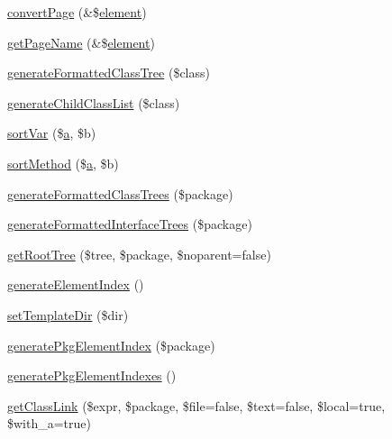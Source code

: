 \begin{DoxyCompactItemize}
\item 
\hyperlink{class_x_m_l_doc_bookpeardoc2_converter_a48d30cbead70c887449fda723aa0bb6e}{convert\-Page} (\&\$\hyperlink{bug-904820_8php_aa94081298ab2dfd0f261cce6c203d9aa}{element})
\item 
\hyperlink{class_x_m_l_doc_bookpeardoc2_converter_ad39e717881e42150610bbed94471f8bf}{get\-Page\-Name} (\&\$\hyperlink{bug-904820_8php_aa94081298ab2dfd0f261cce6c203d9aa}{element})
\item 
\hyperlink{class_x_m_l_doc_bookpeardoc2_converter_a694db0f7353906320d85ee37bd7e2fc5}{generate\-Formatted\-Class\-Tree} (\$class)
\item 
\hyperlink{class_x_m_l_doc_bookpeardoc2_converter_ae3d547d6452f75ae918c03ff383ee29f}{generate\-Child\-Class\-List} (\$class)
\item 
\hyperlink{class_x_m_l_doc_bookpeardoc2_converter_a289e8b5fc5ba77255d344e7d24ac64a5}{sort\-Var} (\$\hyperlink{classa}{a}, \$b)
\item 
\hyperlink{class_x_m_l_doc_bookpeardoc2_converter_ac169dd8b41da10e16c21f4e6685ee3af}{sort\-Method} (\$\hyperlink{classa}{a}, \$b)
\item 
\hyperlink{class_x_m_l_doc_bookpeardoc2_converter_ac4ce6d55dd5c5683966b882dcc6809e0}{generate\-Formatted\-Class\-Trees} (\$package)
\item 
\hyperlink{class_x_m_l_doc_bookpeardoc2_converter_a0950322f71c6ac513f10e25f12aefcf0}{generate\-Formatted\-Interface\-Trees} (\$package)
\item 
\hyperlink{class_x_m_l_doc_bookpeardoc2_converter_a28800b40ee0b082b3e6bf82844c2037c}{get\-Root\-Tree} (\$tree, \$package, \$noparent=false)
\item 
\hyperlink{class_x_m_l_doc_bookpeardoc2_converter_a2b514cc775614890edad823f189b2655}{generate\-Element\-Index} ()
\item 
\hyperlink{class_x_m_l_doc_bookpeardoc2_converter_a3b18827bcab9cfc5d259cba6fa5ec535}{set\-Template\-Dir} (\$dir)
\item 
\hyperlink{class_x_m_l_doc_bookpeardoc2_converter_ad067ad187db8d433a5de042050c63ada}{generate\-Pkg\-Element\-Index} (\$package)
\item 
\hyperlink{class_x_m_l_doc_bookpeardoc2_converter_a147e3da92be9273af6ea18e5a20beeaa}{generate\-Pkg\-Element\-Indexes} ()
\item 
\hyperlink{class_x_m_l_doc_bookpeardoc2_converter_aa0f8f1921df0988e161dff6f4f3e8abf}{get\-Class\-Link} (\$expr, \$package, \$file=false, \$text=false, \$local=true, \$with\-\_\-a=true)
\item 

\end{DoxyCompactItemize}
